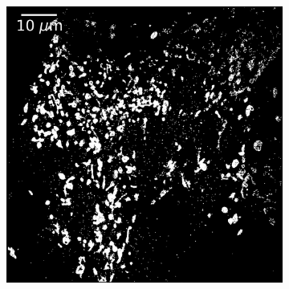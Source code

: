 \begin{figure}[htbp]
\begin{subfigure}{0.49\textwidth}
        \includegraphics[width=\textwidth]{figures/mitochondria_image6.png}
        \caption{}
    \end{subfigure}
    

\end{figure}
